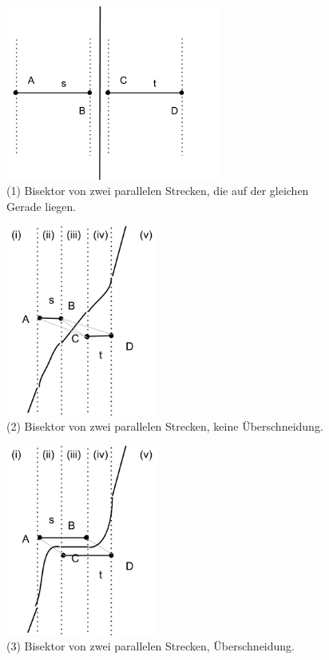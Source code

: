 \begin{figure}[h!]
\begin{center}
\includegraphics[width=7cm]{img/ssp1.png}
\end{center}
\caption{(1) Bisektor von zwei parallelen Strecken, die auf der gleichen Gerade liegen.}
\label{fig:sspc}
\end{figure}

\begin{figure}[h!]
\begin{center}
\includegraphics[width=5cm]{img/ssp2.png}
\end{center}
\caption{(2) Bisektor von zwei parallelen Strecken, keine Überschneidung.}
\label{fig:sspku}
\end{figure}

\begin{figure}[h!]
\begin{center}
\includegraphics[width=5cm]{img/ss3.png}
\end{center}
\caption{(3) Bisektor von zwei parallelen Strecken, Überschneidung.}
\label{fig:sspu}
\end{figure}

